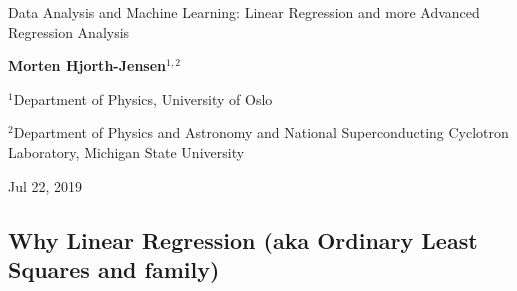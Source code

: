 \documentclass[%
oneside,                 %
final,                   %
10pt]{article}
\begin{document}

\newcommand{\exercisesection}[1]{\subsection*{#1}}






\thispagestyle{empty}

\begin{center}
{\LARGE\bf
\begin{spacing}{1.25}
Data Analysis and Machine Learning: Linear Regression and more Advanced Regression Analysis
\end{spacing}
}
\end{center}


\begin{center}
{\bf Morten Hjorth-Jensen${}^{1, 2}$} \\ [0mm]
\end{center}

\begin{center}
\centerline{{\small ${}^1$Department of Physics, University of Oslo}}
\centerline{{\small ${}^2$Department of Physics and Astronomy and National Superconducting Cyclotron Laboratory, Michigan State University}}
\end{center}
    

\begin{center}
Jul 22, 2019
\end{center}

\vspace{1cm}


\subsection{Why Linear Regression (aka Ordinary Least Squares and family)}
\end{document}
